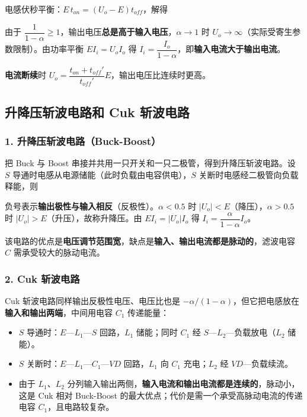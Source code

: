 电感伏秒平衡：$E\,t_{on}=(U_o-E)t_{off}$，解得


由于 $\dfrac{1}{1-\alpha}\ge1$，输出电压\textbf{总是高于输入电压}，$\alpha\to1$ 时 $U_o\to\infty$（实际受寄生参数限制）。由功率平衡 $EI_i=U_oI_o$ 得 $I_i=\dfrac{I_o}{1-\alpha}$，即\textbf{输入电流大于输出电流}。

\textbf{电流断续}时 $U_o=\dfrac{t_{on}+t_{off}'}{t_{off}'}E$，输出电压比连续时更高。


\subsection{升降压斩波电路和 Cuk 斩波电路}

\subsubsection*{1. 升降压斩波电路（Buck-Boost）}

把 Buck 与 Boost 串接并共用一只开关和一只二极管，得到升降压斩波电路。设 $S$ 导通时电感从电源储能（此时负载由电容供电），$S$ 关断时电感经二极管向负载释能，则


负号表示\textbf{输出极性与输入相反}（反极性）。$\alpha<0.5$ 时 $|U_o|<E$（降压），$\alpha>0.5$ 时 $|U_o|>E$（升压），故称升降压。由 $EI_i=|U_o|I_o$ 得 $I_i=\dfrac{\alpha}{1-\alpha}I_o$。

该电路的优点是\textbf{电压调节范围宽}，缺点是\textbf{输入、输出电流都是脉动的}，滤波电容 $C$ 需承受较大的脉动电流。

\subsubsection*{2. Cuk 斩波电路}

Cuk 斩波电路同样输出反极性电压、电压比也是 $-\alpha/(1-\alpha)$，但它把电感放在\textbf{输入和输出两端}，中间用电容 $C_1$ 传递能量：


\begin{itemize}
  \item $S$ 导通时：$E$—$L_1$—$S$ 回路，$L_1$ 储能；同时 $C_1$ 经 $S$—$L_2$—负载放电（$L_2$ 储能）。
  \item $S$ 关断时：$E$—$L_1$—$C_1$—$VD$ 回路，$L_1$ 向 $C_1$ 充电；$L_2$ 经 $VD$—负载续流。
  \item 由于 $L_1$、$L_2$ 分列输入输出两侧，\textbf{输入电流和输出电流都是连续的}，脉动小，这是 Cuk 相对 Buck-Boost 的最大优点；代价是需一个承受高脉动电流的传递电容 $C_1$，且电路较复杂。
\end{itemize}

